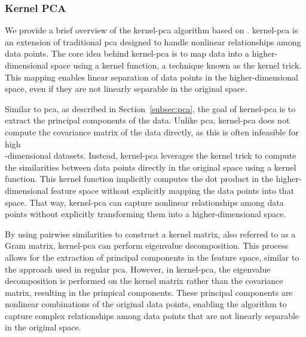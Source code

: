 \subsubsection{Kernel PCA}
We provide a brief overview of the \gls{kernel-pca} algorithm based on \citet{learningwithkernels}.
\gls{kernel-pca} is an extension of traditional \gls{pca} designed to handle nonlinear relationships among data points.
The core idea behind \gls{kernel-pca} is to map data into a higher-dimensional space using a kernel function, a technique known as the kernel trick.
This mapping enables linear separation of data points in the higher-dimensional space, even if they are not linearly separable in the original space.

Similar to \gls{pca}, as described in Section~\ref{subsec:pca}, the goal of \gls{kernel-pca} is to extract the principal components of the data.
Unlike \gls{pca}, \gls{kernel-pca} does not compute the covariance matrix of the data directly, as this is often infeasible for high\\-dimensional datasets.
Instead, \gls{kernel-pca} leverages the kernel trick to compute the similarities between data points directly in the original space using a kernel function.
This kernel function implicitly computes the dot product in the higher-dimensional feature space without explicitly mapping the data points into that space.
That way, \gls{kernel-pca} can capture nonlinear relationships among data points without explicitly transforming them into a higher-dimensional space.

By using pairwise similarities to construct a kernel matrix, also referred to as a Gram matrix, \gls{kernel-pca} can perform eigenvalue decomposition.
This process allows for the extraction of principal components in the feature space, similar to the approach used in regular \gls{pca}.
However, in \gls{kernel-pca}, the eigenvalue decomposition is performed on the kernel matrix rather than the covariance matrix, resulting in the prinpical components.
These principal components are nonlinear combinations of the original data points, enabling the algorithm to capture complex relationships among data points that are not linearly separable in the original space.